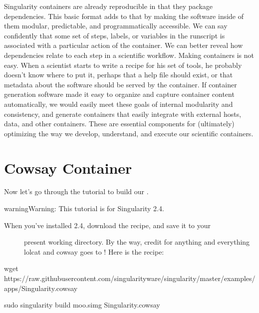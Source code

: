 \documentclass[letterpaper,10pt,english]{sphinxmanual}
\begin{document}
Singularity containers are already reproducible in that they package
dependencies. This basic format adds to that by making the software
inside of them modular, predictable, and programmatically accessible. We
can say confidently that some set of steps, labels, or variables in the
runscript is associated with a particular action of the container. We
can better reveal how dependencies relate to each step in a scientific
workflow. Making containers is not easy. When a scientist starts to
write a recipe for his set of tools, he probably doesn’t know where to
put it, perhaps that a help file should exist, or that metadata about
the software should be served by the container. If container generation
software made it easy to organize and capture container content
automatically, we would easily meet these goals of internal modularity
and consistency, and generate containers that easily integrate with
external hosts, data, and other containers. These are essential
components for (ultimately) optimizing the way we develop, understand,
and execute our scientific containers.


\section{Cowsay Container}
\label{\detokenize{reproducible_scif_apps:cowsay-container}}
Now let’s go through the tutorial to build our {\hyperref[\detokenize{reproducible_scif_apps:cowsay-container}]{}}.

\begin{sphinxadmonition}{warning}{Warning:}
 This tutorial is for Singularity 2.4.
\end{sphinxadmonition}
\begin{description}
\item[{When you’ve installed 2.4, download the recipe, and save it to your}] \leavevmode
present working directory. By the way, credit for anything and
everything lolcat and cowsay goes to ! Here is the recipe:

\end{description}

%
\begin{sphinxVerbatim}[commandchars=\\\{\}]
wget https://raw.githubusercontent.com/singularityware/singularity/master/examples/apps/Singularity.cowsay

sudo singularity build moo.simg Singularity.cowsay
\end{sphinxVerbatim}
\end{document}
